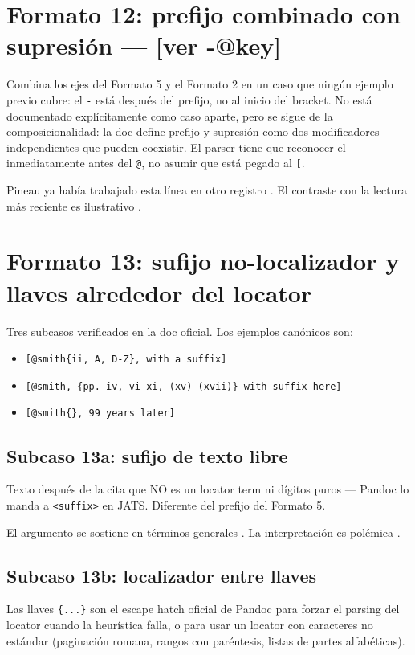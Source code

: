 \documentclass{article}
\begin{document}
\section{Formato 12: prefijo combinado con supresión — [ver -@key]}
Combina los ejes del Formato 5 y el Formato 2 en un caso que ningún ejemplo previo cubre: el \texttt{-} está después del prefijo, no al inicio del bracket. No está documentado explícitamente como caso aparte, pero se sigue de la composicionalidad: la doc define prefijo y supresión como dos modificadores independientes que pueden coexistir. El parser tiene que reconocer el \texttt{-} inmediatamente antes del \texttt{@}, no asumir que está pegado al \texttt{[}.

Pineau ya había trabajado esta línea en otro registro \autocite*[ver][]{3041-PINEAU1999}. El contraste con la lectura más reciente es ilustrativo \autocite*[cf.][]{3036-ORBUCH2020}.


\section{Formato 13: sufijo no-localizador y llaves alrededor del locator}
Tres subcasos verificados en la doc oficial. Los ejemplos canónicos son:

\begin{itemize}
  \item \texttt{[@smith\{ii, A, D-Z\}, with a suffix]}
  \item \texttt{[@smith, \{pp. iv, vi-xi, (xv)-(xvii)\} with suffix here]}
  \item \texttt{[@smith\{\}, 99 years later]}
\end{itemize}

\subsection{Subcaso 13a: sufijo de texto libre}
Texto después de la cita que NO es un locator term ni dígitos puros — Pandoc lo manda a \texttt{<suffix>} en JATS. Diferente del prefijo del Formato 5.

El argumento se sostiene en términos generales \autocite[énfasis añadido]{2961-KACZAN2016}. La interpretación es polémica \autocite[pero ver la crítica reciente]{3041-PINEAU1999}.


\subsection{Subcaso 13b: localizador entre llaves}
Las llaves \texttt{\{...\}} son el escape hatch oficial de Pandoc para forzar el parsing del locator cuando la heurística falla, o para usar un locator con caracteres no estándar (paginación romana, rangos con paréntesis, listas de partes alfabéticas).
\end{document}
